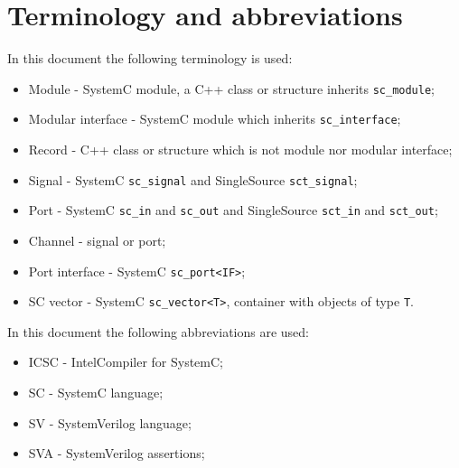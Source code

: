 \section{Terminology and abbreviations}

In this document the following terminology is used:
%
\begin{itemize}
\item Module - SystemC module, a C++ class or structure inherits {\tt sc\_module};
\item Modular interface - SystemC module which inherits {\tt sc\_interface};
\item Record - C++ class or structure which is not module nor modular interface;
\item Signal - SystemC {\tt sc\_signal} and SingleSource {\tt sct\_signal};
\item Port - SystemC {\tt sc\_in} and {\tt sc\_out} and SingleSource {\tt sct\_in} and {\tt sct\_out};
\item Channel - signal or port;
\item Port interface - SystemC {\tt sc\_port<IF>};
\item SC vector - SystemC {\tt sc\_vector<T>}, container with objects of type {\tt T}.
\end{itemize}
%
In this document the following abbreviations are used:
%
\begin{itemize}
\item ICSC - Intel\textregistered Compiler for SystemC;
\item SC - SystemC language;
\item SV - SystemVerilog language;
\item SVA - SystemVerilog assertions;
\end{itemize}




\ifdefined\INTEL

\else

\fi










\ifdefined\INTEL
 
\fi



%


